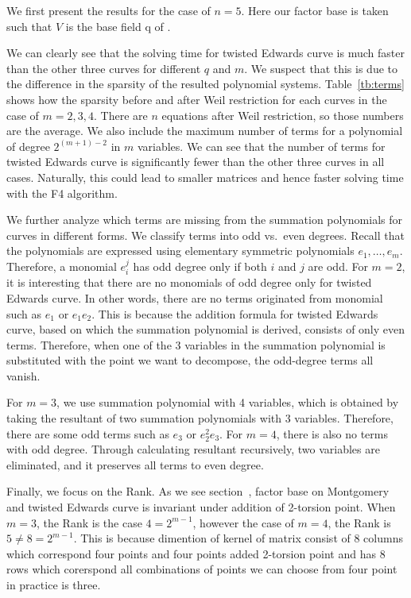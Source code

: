 We first present the results for the case of $n=5$.
%
Here our factor base is taken such that $V$ is the base field \F q of
.
%


We can clearly see that the solving time for twisted Edwards curve is
much faster than the other three curves for different $q$ and $m$.
%
We suspect that this is due to the difference in the sparsity of the
resulted polynomial systems.
%
Table~\ref{tb:terms} shows how the sparsity before and after Weil
restriction for each curves in the case of $m=2,3,4$.
%
There are $n$ equations after Weil restriction, so those numbers are
the average.
%
We also include the maximum number of terms for a polynomial of degree
$2^{(m+1)-2}$ in $m$ variables.
%
We can see that the number of terms for twisted Edwards curve is
significantly fewer than the other three curves in all cases.
%
Naturally, this could lead to smaller matrices and hence faster
solving time with the F4 algorithm.



We further analyze which terms are missing from the summation
polynomials for curves in different forms.
%
We classify terms into odd vs.~even degrees.
%
Recall that the polynomials are expressed using elementary symmetric polynomials 
$e_1, \dots ,e_m$.
%
Therefore, a monomial $e_i^j$ has odd degree only if both $i$ and $j$
are odd.
%
For $m=2$, it is interesting that there are no monomials of odd degree
only for twisted Edwards curve.
%
In other words, there are no terms originated from monomial such as
$e_1$ or $e_1e_2$.
%
This is because the addition formula for twisted Edwards curve, based
on which the summation polynomial is derived, consists of only even
terms.
%
Therefore, when one of the 3 variables in the summation polynomial is
substituted with the point we want to decompose, the odd-degree terms
all vanish.

For $m=3$, we use summation polynomial with 4 variables, which is
obtained by taking the resultant of two summation polynomials 
with 3 variables.
%
Therefore, there are some odd terms such as $e_3$ or $e_2^2e_3$.
%
For $m=4$, there is also no terms with odd degree.
%
Through calculating resultant recursively, two variables are
eliminated, and it preserves all terms to even degree.

Finally, we focus on the Rank.
%
As we see section~\cite{sec:isomorphisms}, factor base on
Montgomery and twisted Edwards curve is invariant under addition
of 2-torsion point.
%
When $m=3$, the Rank is the case $4 = 2^{m-1}$,
however the case of $m=4$, the Rank is $5 \neq 8 = 2^{m-1}$.
%
This is because dimention of kernel of matrix consist of 8 
columns which correspond four points and four points added 
2-torsion point and has 8 rows which corerspond all combinations
of points we can choose from four point in practice is three.
%



